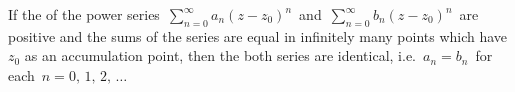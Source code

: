 \documentclass[12pt]{article}
\theoremstyle{definition}
\begin{document}
If the  of the power series\, $\sum_{n=0}^\infty a_n(z-z_0)^n$\, and\, $\sum_{n=0}^\infty b_n(z-z_0)^n$\, are positive and the sums of the series are equal in infinitely many points which have $z_0$ as an accumulation point, then the both series are identical, i.e.\, $a_n = b_n$\, for each\, $n = 0,\,1,\,2,\,\ldots$
\end{document}
